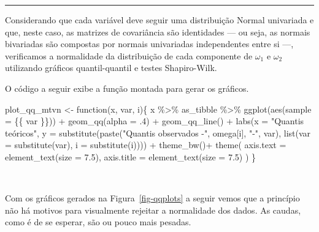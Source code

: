 \documentclass[
  a4paperpaper,
]{article}
\newenvironment{Shaded}{\begin{snugshade}}{\end{snugshade}}
\newcommand{\AttributeTok}[1]{\textcolor[rgb]{0.40,0.45,0.13}{#1}}
\newcommand{\ControlFlowTok}[1]{\textcolor[rgb]{0.00,0.23,0.31}{#1}}
\newcommand{\DecValTok}[1]{\textcolor[rgb]{0.68,0.00,0.00}{#1}}
\newcommand{\FloatTok}[1]{\textcolor[rgb]{0.68,0.00,0.00}{#1}}
\newcommand{\FunctionTok}[1]{\textcolor[rgb]{0.28,0.35,0.67}{#1}}
\newcommand{\NormalTok}[1]{\textcolor[rgb]{0.00,0.23,0.31}{#1}}
\newcommand{\OtherTok}[1]{\textcolor[rgb]{0.00,0.23,0.31}{#1}}
\newcommand{\SpecialCharTok}[1]{\textcolor[rgb]{0.37,0.37,0.37}{#1}}
\newcommand{\StringTok}[1]{\textcolor[rgb]{0.13,0.47,0.30}{#1}}
\begin{document}
\begin{center}\rule{0.5\linewidth}{0.5pt}\end{center}

Considerando que cada variável deve seguir uma distribuição Normal
univariada e que, neste caso, as matrizes de covariância são identidades
--- ou seja, as normais bivariadas são compostas por normais univariadas
independentes entre si ---, verificamos a normalidade da distribuição de
cada componente de \(\omega_1\) e \(\omega_2\) utilizando gráficos
quantil-quantil e testes Shapiro-Wilk.

O código a seguir exibe a função montada para gerar os gráficos.

\begin{Shaded}
\begin{Highlighting}[]
\NormalTok{plot\_qq\_mtvn }\OtherTok{\textless{}{-}} \ControlFlowTok{function}\NormalTok{(x, var, i)\{}
\NormalTok{  x }\SpecialCharTok{\%\textgreater{}\%} 
\NormalTok{  as\_tibble }\SpecialCharTok{\%\textgreater{}\%}
  \FunctionTok{ggplot}\NormalTok{(}\FunctionTok{aes}\NormalTok{(}\AttributeTok{sample =}\NormalTok{ \{\{ var \}\})) }\SpecialCharTok{+}
  \FunctionTok{geom\_qq}\NormalTok{(}\AttributeTok{alpha =}\NormalTok{ .}\DecValTok{4}\NormalTok{) }\SpecialCharTok{+}
  \FunctionTok{geom\_qq\_line}\NormalTok{() }\SpecialCharTok{+}
  \FunctionTok{labs}\NormalTok{(}\AttributeTok{x =} \StringTok{"Quantis teóricos"}\NormalTok{, }
       \AttributeTok{y =} \FunctionTok{substitute}\NormalTok{(}\FunctionTok{paste}\NormalTok{(}\StringTok{"Quantis observados {-}"}\NormalTok{, omega[i], }\StringTok{"{-}"}\NormalTok{, var), }
                      \FunctionTok{list}\NormalTok{(}\AttributeTok{var =} \FunctionTok{substitute}\NormalTok{(var),}
                      \AttributeTok{i =} \FunctionTok{substitute}\NormalTok{(i)))) }\SpecialCharTok{+}
  \FunctionTok{theme\_bw}\NormalTok{()}\SpecialCharTok{+}
  \FunctionTok{theme}\NormalTok{(}
    \AttributeTok{axis.text =} \FunctionTok{element\_text}\NormalTok{(}\AttributeTok{size =} \FloatTok{7.5}\NormalTok{),}
    \AttributeTok{axis.title =} \FunctionTok{element\_text}\NormalTok{(}\AttributeTok{size =} \FloatTok{7.5}\NormalTok{)}
\NormalTok{  )}
\NormalTok{\}}
\end{Highlighting}
\end{Shaded}

~

Com os gráficos gerados na Figura~\ref{fig-qqplots} a seguir vemos que a
princípio não há motivos para visualmente rejeitar a normalidade dos
dados. As caudas, como é de se esperar, são ou pouco mais pesadas.
\end{document}
